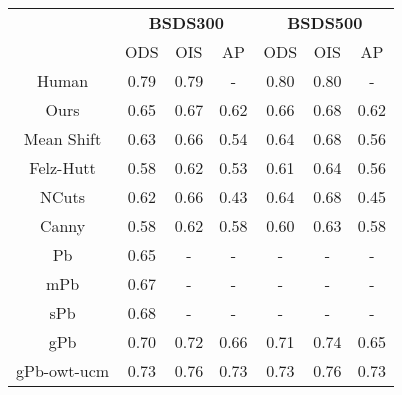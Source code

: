 \begin{table}[]
\centering
\begin{tabular}{c|c|c|c||c|c|c|}
\cline{2-7}
                                  & \multicolumn{3}{c||}{\textbf{BSDS300}} & \multicolumn{3}{c|}{\textbf{BSDS500}} \\ \cline{2-7} 
                                  & ODS         & OIS        & AP         & ODS         & OIS        & AP         \\ \hline
\multicolumn{1}{|c|}{Human}       & 0.79        & 0.79       & -          & 0.80        & 0.80       & -          \\ \hline
\multicolumn{1}{|c|}{Ours}        & 0.65        & 0.67       & 0.62       & 0.66        & 0.68       & 0.62       \\
\multicolumn{1}{|c|}{Mean Shift}  & 0.63        & 0.66       & 0.54       & 0.64        & 0.68       & 0.56       \\
\multicolumn{1}{|c|}{Felz-Hutt}   & 0.58        & 0.62       & 0.53       & 0.61        & 0.64       & 0.56       \\
\multicolumn{1}{|c|}{NCuts}       & 0.62        & 0.66       & 0.43       & 0.64        & 0.68       & 0.45       \\
\multicolumn{1}{|c|}{Canny}       & 0.58        & 0.62       & 0.58       & 0.60        & 0.63       & 0.58       \\
\multicolumn{1}{|c|}{Pb}          & 0.65        & -          & -          & -           & -          & -          \\ \hline
\multicolumn{1}{|c|}{mPb}         & 0.67        & -          & -          & -           & -          & -          \\
\multicolumn{1}{|c|}{sPb}         & 0.68        & -          & -          & -           & -          & -          \\
\multicolumn{1}{|c|}{gPb}         & 0.70        & 0.72       & 0.66       & 0.71        & 0.74       & 0.65       \\
\multicolumn{1}{|c|}{gPb-owt-ucm} & 0.73        & 0.76       & 0.73       & 0.73        & 0.76       & 0.73       \\ \hline
\end{tabular}
\end{table}


